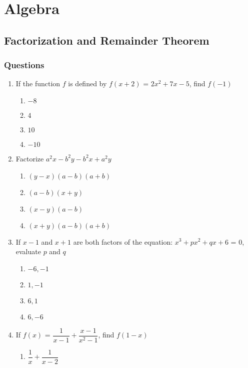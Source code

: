\chapter{Algebra}
\section{Factorization and Remainder Theorem}
\subsection{Questions}
\begin{multicols}{2}
  \begin{enumerate}[label={\arabic*.}]
    \item If the function \(f\) is defined by \(f(x+2)\) = \(2{x}^{2} + 7x -5\), find \(f(-1)\)
      \begin{enumerate}[label={\Alph*.}]
        \item \(-8\)
        \item \(4\)
        \item \(10\)
        \item \(-10\)
      \end{enumerate}
    \item Factorize \(a^2x - b^2y - b^2x + a^2y\)
      \begin{enumerate}[label={\Alph*.}]
        \item \((y-x)(a-b)(a+b)\)
        \item \((a-b)(x+y)\)
        \item \((x-y)(a-b)\)
        \item \((x+y)(a-b)(a+b)\)
      \end{enumerate}
    \item If \(x - 1\) and \(x + 1\) are both factors of the equation: \({x}^{3} + p{x}^{2} + qx + 6 \) = 0,
      evaluate $p$ and $q$
      \begin{enumerate}[label={\Alph*.}]
        \item \(-6, -1\)
        \item \(1, -1\)
        \item \(6, 1\)
        \item \(6, -6\)
      \end{enumerate}
    \item If \(f(x)\) = \(\dfrac{1}{x - 1} + \dfrac{x - 1}{{x}^{2} - 1}\), find \(f(1 - x)\)
      \begin{enumerate}[label={\Alph*.}]
        \item \(\dfrac{1}{x} + \dfrac{1}{x - 2}\)

\end{enumerate}
\end{enumerate}
\end{multicols}
